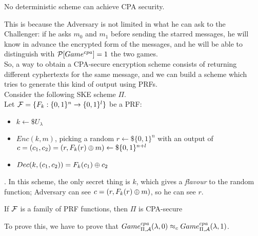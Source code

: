 \begin{observation}
    No deterministic scheme can achieve CPA security.
\end{observation}
This is because the Adversary is not limited in what he can ask to the
Challenger: if he asks $m_{0}$ and $m_{1}$ before sending the starred messages,
he will know in advance the encrypted form of the messages, and he will be able
to distinguish with $ \P [Game^{cpa}]=1 $ the two games.\\

So, a way to obtain a CPA-secure encryption scheme consists of returning
different cyphertexts for the same message, and we can build a scheme which
tries to generate this kind of output using PRFs.\\

Consider the following SKE scheme $\Pi$.\\
Let $\F=\{ F_{k}:\{0,1\}^{n} \to \{0,1\}^{l} \}$ be a
PRF:
\begin{itemize}
    \item $k \leftarrow\$ U_{\lambda}$
    \item $Enc(k, m)$, picking a random $r \leftarrow\$ \{0,1\}^{n} $ with an
        output of $c=(c_{1}, c_{2})=(r, F_{k}(r) \xor m) \leftarrow\$
        \{0,1\}^{n+l}$
    
    \item $Dec(k, (c_{1}, c_{2}))=F_{k}(c_{1}) \xor c_{2}$
\end{itemize}
.
In this scheme, the only secret thing is $k$, which gives a \textit{flavour} to
the random function; Adversary can see $c=(r, F_{k}(r) \xor m)$, so he can see
$r$.
\begin{theorem}
    If $\F$ is a family of PRF functions, then $\Pi$ is  CPA-secure
\end{theorem}
To prove this, we have to prove that $Game_{\Pi, \A}^{cpa}(\lambda, 0)
\approx_{c} Game_{\Pi, \A}^{cpa}(\lambda, 1)$.
